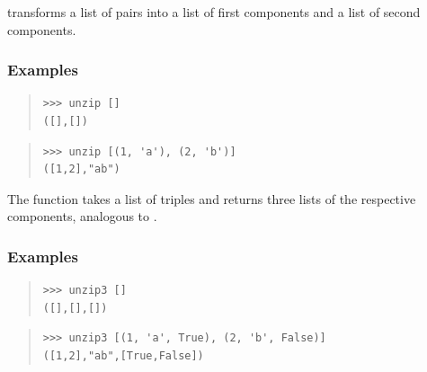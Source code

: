 \begin{haddockdesc}
\item[\begin{tabular}{@{}l}
unzip :: {\char 91}(a, b){\char 93} -> ({\char 91}a{\char 93}, {\char 91}b{\char 93})
\end{tabular}]
{\haddockbegindoc
{} transforms a list of pairs into a list of first components
 and a list of second components.\par
\subsubsection*{\textbf{Examples}}
\begin{quote}
{\haddockverb\begin{verbatim}
>>> unzip []
([],[])

\end{verbatim}}
\end{quote}
\begin{quote}
{\haddockverb\begin{verbatim}
>>> unzip [(1, 'a'), (2, 'b')]
([1,2],"ab")

\end{verbatim}}
\end{quote}}
\end{haddockdesc}
\begin{haddockdesc}
\item[\begin{tabular}{@{}l}
unzip3 :: {\char 91}(a, b, c){\char 93} -> ({\char 91}a{\char 93}, {\char 91}b{\char 93}, {\char 91}c{\char 93})
\end{tabular}]
{\haddockbegindoc
The  function takes a list of triples and returns three
 lists of the respective components, analogous to .\par
\subsubsection*{\textbf{Examples}}
\begin{quote}
{\haddockverb\begin{verbatim}
>>> unzip3 []
([],[],[])

\end{verbatim}}
\end{quote}
\begin{quote}
{\haddockverb\begin{verbatim}
>>> unzip3 [(1, 'a', True), (2, 'b', False)]
([1,2],"ab",[True,False])

\end{verbatim}}
\end{quote}}
\end{haddockdesc}
